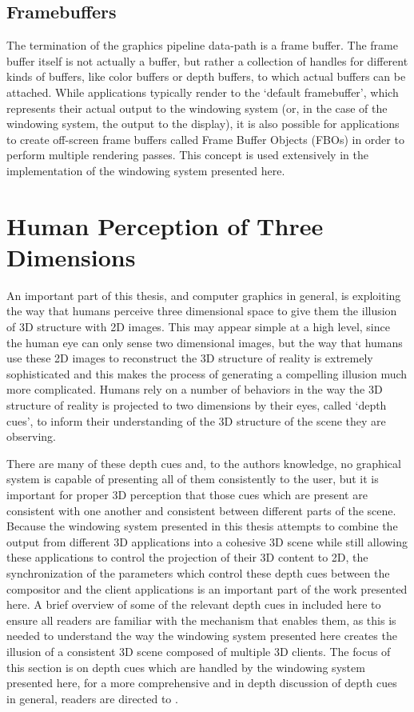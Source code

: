 \subsection{Framebuffers}

The termination of the graphics pipeline data-path is a frame buffer. The frame buffer itself is not actually a buffer, but rather a collection of handles for different kinds of buffers, like color buffers or depth buffers, to which actual buffers can be attached. While applications typically render to the `default framebuffer', which represents their actual output to the windowing system (or, in the case of the windowing system, the output to the display), it is also possible for applications to create off-screen frame buffers called Frame Buffer Objects (FBOs) in order to perform multiple rendering passes. This concept is used extensively in the implementation of the windowing system presented here. 

\section{Human Perception of Three Dimensions}
\label{sec:depth-perception}

An important part of this thesis, and computer graphics in general, is exploiting the way that humans perceive three dimensional space to give them the illusion of 3D structure with 2D images. This may appear simple at a high level, since the human eye can only sense two dimensional images, but the way that humans use these 2D images to reconstruct the 3D structure of reality is extremely sophisticated and this makes the process of generating a compelling illusion much more complicated. Humans rely on a number of behaviors in the way the 3D structure of reality is projected to two dimensions by their eyes, called `depth cues', to inform their understanding of the 3D structure of the scene they are observing.
	
There are many of these depth cues and, to the authors knowledge, no graphical system is capable of presenting all of them consistently to the user, but it is important for proper 3D perception that those cues which are present are consistent with one another and consistent between different parts of the scene. Because the windowing system presented in this thesis attempts to combine the output from different 3D applications into a cohesive 3D scene while still allowing these applications to control the projection of their 3D content to 2D, the synchronization of the parameters which control these depth cues between the compositor and the client applications is an important part of the work presented here. A brief overview of some of the relevant depth cues in included here to ensure all readers are familiar with the mechanism that enables them, as this is needed to understand the way the windowing system presented here creates the illusion of a consistent 3D scene composed of multiple 3D clients. The focus of this section is on depth cues which are handled by the windowing system presented here, for a more comprehensive and in depth discussion of depth cues in general, readers are directed to \cite{depth-cues}.

